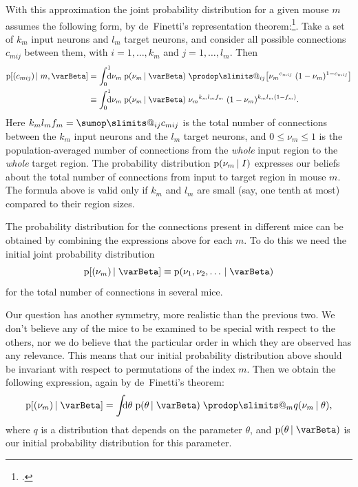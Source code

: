 \documentclass[\ifafour a4paper,12pt,\else a5paper,10pt,\fi%
onecolumn,oneside,article,%
british%
]{memoir}
\makeatletter
\theoremstyle{remark}
\theoremstyle{innote}
\def\sum{\DOTSI\sumop\slimits@}
\def\prod{\DOTSI\prodop\slimits@}
\newcommand*{\citep}{\footcites}
\newcommand*{\di}{\mathrm{d}}%
\renewcommand*{\le}{\leqslant}%
\newcommand*{\pf}{\mathrm{p}}%
\renewcommand*{\|}[1][]{\nonscript\,#1\vert\nonscript\;\mathopen{}}
\newcommand*{\yI}{\varBeta}
\newcommand*{\yc}{c}
\newcommand*{\yf}{f}
\newcommand*{\yq}{q}
\newcommand*{\yth}{\theta}
\makeatother
\begin{document}
With this approximation the joint probability distribution for a given
mouse $m$ assumes the following form, by de~Finetti's representation
theorem:\citep{definetti1930,hewittetal1955,heathetal1976,diaconis1977,diaconisetal1980,dawid2013}.
Take a set of $k_{m}$ input neurons and $l_{m}$ target neurons, and
consider all possible connections $\yc_{mij}$ between them, with
$i=1,\dotsc,k_{m}$ and $j=1,\dotsc,l_{m}$. Then
\begin{equation}
  \label{eq:definetti_ij}
  \begin{split}
  \pf[(\yc_{mij}) \| m, \yI] &=
  \int_{0}^{1}\!\!\!\!\di\nu_{m}\;\pf(\nu_{m} \| \yI)\;
  \prod_{ij}\bigl[
  {\nu_{m}}^{\yc_{mij}}\;(1-\nu_{m})^{1-\yc_{mij}}
  \bigr]
  \\
  &\equiv \int_{0}^{1}\!\!\!\!\di\nu_{m}\;\pf(\nu_{m} \| \yI)\;
  {\nu_{m}}^{k_{m}l_{m}\yf_{m}}\;
  (1-\nu_{m})^{k_{m}l_{m}(1-\yf_{m})}.
\end{split}
\end{equation}
Here $k_{m}l_{m}\yf_{m} = \sum_{ij} \yc_{mij}$ is the total number of
connections between the $k_{m}$ input neurons and the $l_{m}$ target
neurons, and $0\le \nu_{m} \le 1$ is the population-averaged number of
connections from the \emph{whole} input region to the \emph{whole} target
region. The probability distribution $\pf(\nu_{m} \| I)$ expresses our
beliefs about the total number of connections from input to target region
in mouse $m$. The formula above is valid only if $k_{m}$ and $l_{m}$ are
small (say, one tenth at most) compared to their region sizes.

\medskip

The probability distribution for the connections present in different mice
can be obtained by combining the expressions above for each $m$. To do this
we need the initial joint probability distribution
\begin{equation}\label{eq:joint_nu_generic}
  \pf[(\nu_{m}) \| \yI]
  \equiv \pf(\nu_{1}, \nu_{2}, \dotsc \| \yI)
\end{equation}
for the total number of connections in several mice.

Our question has another symmetry, more realistic than the previous two. We
don't believe any of the mice to be examined to be special with respect to
the others, nor we do believe that the particular order in which they are
observed has any relevance. This means that our initial probability
distribution above should be invariant with respect to permutations of the
index $m$. Then we obtain the following expression, again by de~Finetti's
theorem:
\begin{equation}\label{eq:joint_nu_definetti}
  \pf[(\nu_{m}) \| \yI] =
  \int\!\!\!\di\yth\;\pf(\yth \| \yI)\;
  \prod_{m}  \yq(\nu_{m} \| \yth),
\end{equation}
where $\yq$ is a distribution that depends on the parameter $\yth$, and
$\pf(\yth \| \yI)$ is our initial probability distribution for this
parameter.
\end{document}
